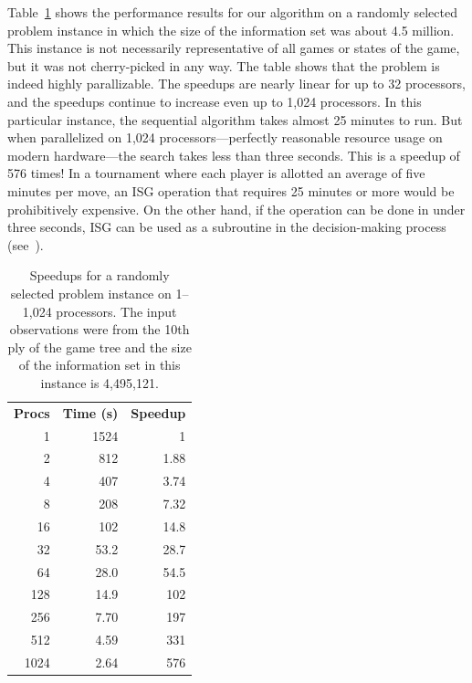 \documentclass[times, 10pt,twocolumn]{article}
\begin{document}
Table~\ref{speedups} shows the performance results for our algorithm on a
randomly selected problem instance in which the size of the information set was
about 4.5 million.  This instance is not necessarily representative of all
games or states of the game, but it was not cherry-picked in any way. The table
shows that the problem is indeed highly parallizable. The speedups are nearly
linear for up to 32 processors, and the speedups continue to increase even up
to 1,024 processors. In this particular instance, the sequential algorithm
takes almost 25 minutes to run.  But when parallelized on 1,024
processors---perfectly reasonable resource usage on modern hardware---the
search takes less than three seconds.  This is a speedup of 576 times! In a
tournament where each player is allotted an average of five minutes per move,
an ISG operation that requires 25 minutes or more would be prohibitively
expensive.  On the other hand, if the operation can be done in under three
seconds, ISG can be used as a subroutine in the decision-making process
(see~\cite{parker05game}). 

\begin{table}
\centering
\begin{tabular}{rrr}
{\bf Procs}	&	{\bf Time (s)} 	&	{\bf Speedup}\\
1	&	1524	&	1\\
2	&	812	&	1.88\\
4	&	407	&	3.74\\
8	&	208	&	7.32\\
16	&	102	&	14.8\\
32	&	53.2	&	28.7\\
64	&	28.0	&	54.5\\
128	&	14.9	&	102\\
256	&	7.70	&	197\\
512	&	4.59	&	331\\
1024	&	2.64	&	576\\
\end{tabular}
\vspace{-0.1in}

\caption{Speedups for a randomly selected problem instance on 1--1,024
processors.  The input observations were from the 10th ply of the game tree and
the size of the information set in this instance is 4,495,121.}

\label{speedups}
\vspace{-0.3in}
\end{table}
\end{document}
